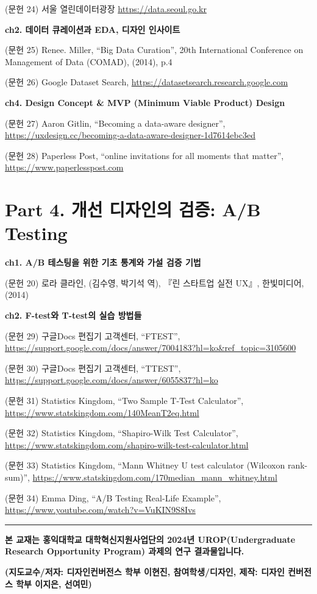 \documentclass[
  letterpaper,
]{book}
\begin{document}
(문헌 24) 서울 열린데이터광장 \url{https://data.seoul.go.kr}

\textbf{ch2. 데이터 큐레이션과 EDA, 디자인 인사이트}

(문헌 25) Renee. Miller, ``Big Data Curation'', 20th International
Conference on Management of Data (COMAD), (2014), p.4

(문헌 26) Google Dataset Search,
\url{https://datasetsearch.research.google.com}

\textbf{ch4. Design Concept \& MVP (Minimum Viable Product) Design}

(문헌 27) Aaron Gitlin, ``Becoming a data-aware designer'',
\url{https://uxdesign.cc/becoming-a-data-aware-designer-1d7614ebc3ed}

(문헌 28) Paperless Post, ``online invitations for all moments that
matter'', \url{https://www.paperlesspost.com}

\section*{Part 4. 개선 디자인의 검증: A/B
Testing}\label{part-4.-uxac1cuxc120-uxb514uxc790uxc778uxc758-uxac80uxc99d-ab-testing-2}


\textbf{ch1. A/B 테스팅을 위한 기초 통계와 가설 검증 기법}

(문헌 20) 로라 클라인, (김수영, 박기석 역), 『린 스타트업 실전 UX』,
한빛미디어,(2014)

\textbf{ch2. F-test와 T-test의 실습 방법들}

(문헌 29) 구글Docs 편집기 고객센터, ``FTEST'',
\url{https://support.google.com/docs/answer/7004183?hl=ko&ref_topic=3105600}

(문헌 30) 구글Docs 편집기 고객센터, ``TTEST'',
\url{https://support.google.com/docs/answer/6055837?hl=ko}

(문헌 31) Statistics Kingdom, ``Two Sample T-Test Calculator'',
\url{https://www.statskingdom.com/140MeanT2eq.html}

(문헌 32) Statistics Kingdom, ``Shapiro-Wilk Test Calculator'',
\url{https://www.statskingdom.com/shapiro-wilk-test-calculator.html}

(문헌 33) Statistics Kingdom, ``Mann Whitney U test calculator (Wilcoxon
rank-sum)'',
\url{https://www.statskingdom.com/170median_mann_whitney.html}

(문헌 34) Emma Ding, ``A/B Testing Real-Life Example'',
\url{https://www.youtube.com/watch?v=VuKIN9S8Ivs}

\begin{center}\rule{0.5\linewidth}{0.5pt}\end{center}

\textbf{본 교재는 홍익대학교 대학혁신지원사업단의 2024년
UROP(Undergraduate Research Opportunity Program) 과제의 연구
결과물입니다.}

\textbf{(지도교수/저자: 디자인컨버전스 학부 이현진, 참여학생/디자인,
제작: 디자인 컨버전스 학부 이지은, 선여민)}


\backmatter
\printbibliography


\printindex
\end{document}
